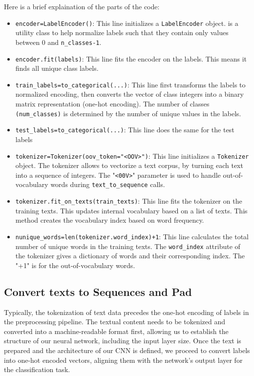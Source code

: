 Here is a brief explaination of the parts of the code:
\begin{itemize}
	\item \verb*|encoder=LabelEncoder()|: This line initializes a \verb*|LabelEncoder| object. is a utility class to help normalize labels such that they contain only values between $0$ and \verb*|n_classes-1|.
	
	\item \verb*|encoder.fit(labels)|: This line fits the encoder on the labels. This means it finds all unique class labels.
	
	\item \verb*|train_labels=to_categorical(...)|: This line first transforms the labels to normalized encoding, then converts the vector of class integers into a binary matrix representation (one-hot encoding). The number of classes \verb*|(num_classes)| is determined by the number of unique values in the labels.
	
	\item \verb*|test_labels=to_categorical(...)|:  This line does the same for the test labels
	
	\item \verb*|tokenizer=Tokenizer(oov_token="<OOV>")|: This line initializes a \verb*|Tokenizer| object. The tokenizer allows to vectorize a text corpus, by turning each text into a sequence of integers. The "\verb*|<00V>|" parameter is used to handle out-of-vocabulary words during \verb*|text_to_sequence| calls.
	
	\item \verb*|tokenizer.fit_on_texts(train_texts)|: This line fits the tokenizer on the training texts. This updates internal vocabulary based on a list of texts. This method creates the vocabulary index based on word frequency.
	
	\item \verb*|nunique_words=len(tokenizer.word_index)+1|: This line calculates the total number of unique words in the training texts. The \verb*|word_index| attribute of the tokenizer gives a dictionary of words and their corresponding index. The "+1" is for the out-of-vocabulary words.
\end{itemize}

\subsection{Convert texts to Sequences and Pad}
Typically, the tokenization of text data precedes the one-hot encoding of labels in the preprocessing pipeline. The textual content needs to be tokenized and converted into a machine-readable format first, allowing us to establish the structure of our neural network, including the input layer size. Once the text is prepared and the architecture of our CNN is defined, we proceed to convert labels into one-hot encoded vectors, aligning them with the network's output layer for the classification task.

